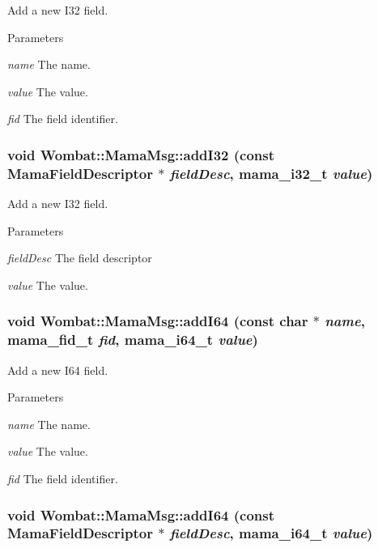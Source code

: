 Add a new I32 field. 
\begin{DoxyParams}{Parameters}
\item[{\em name}]The name. \item[{\em value}]The value. \item[{\em fid}]The field identifier. \end{DoxyParams}
\hypertarget{classWombat_1_1MamaMsg_afe3934a1becbd328ac5d7af913648061}{
\subsubsection[{addI32}]{\setlength{\rightskip}{0pt plus 5cm}void Wombat::MamaMsg::addI32 (const {\bf MamaFieldDescriptor} $\ast$ {\em fieldDesc}, \/  mama\_\-i32\_\-t {\em value})}}
\label{classWombat_1_1MamaMsg_afe3934a1becbd328ac5d7af913648061}


Add a new I32 field. 
\begin{DoxyParams}{Parameters}
\item[{\em fieldDesc}]The field descriptor \item[{\em value}]The value. \end{DoxyParams}
\hypertarget{classWombat_1_1MamaMsg_ad9cfb8e50a5dea9db137f9aabfc2bb7e}{
\subsubsection[{addI64}]{\setlength{\rightskip}{0pt plus 5cm}void Wombat::MamaMsg::addI64 (const char $\ast$ {\em name}, \/  mama\_\-fid\_\-t {\em fid}, \/  mama\_\-i64\_\-t {\em value})}}
\label{classWombat_1_1MamaMsg_ad9cfb8e50a5dea9db137f9aabfc2bb7e}


Add a new I64 field. 
\begin{DoxyParams}{Parameters}
\item[{\em name}]The name. \item[{\em value}]The value. \item[{\em fid}]The field identifier. \end{DoxyParams}
\hypertarget{classWombat_1_1MamaMsg_a358b0886b71032e7ab73f52f58b2f7cf}{
\subsubsection[{addI64}]{\setlength{\rightskip}{0pt plus 5cm}void Wombat::MamaMsg::addI64 (const {\bf MamaFieldDescriptor} $\ast$ {\em fieldDesc}, \/  mama\_\-i64\_\-t {\em value})}}
\label{classWombat_1_1MamaMsg_a358b0886b71032e7ab73f52f58b2f7cf}


